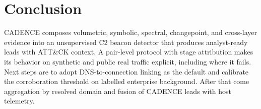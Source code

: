 \documentclass[runningheads]{llncs}
\begin{document}
\section{Conclusion}

CADENCE composes volumetric, symbolic, spectral, changepoint, and cross-layer evidence into an unsupervised C2 beacon detector that produces analyst-ready leads with ATT\&CK context. A pair-level protocol with stage attribution makes its behavior on synthetic and public real traffic explicit, including where it fails. Next steps are to adopt DNS-to-connection linking as the default and calibrate the corroboration threshold on labelled enterprise background. After that come aggregation by resolved domain and fusion of CADENCE leads with host telemetry.



\end{document}
